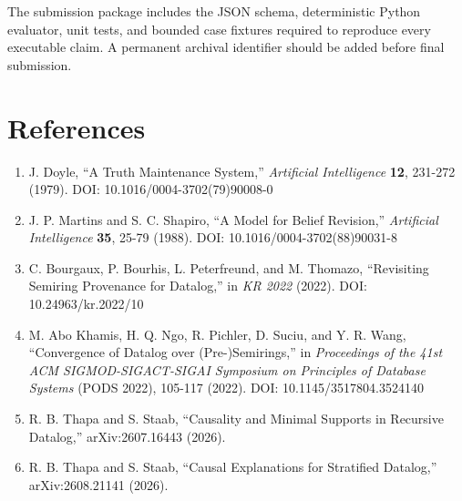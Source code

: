 \documentclass[
  11pt,
]{article}
\providecommand{\tightlist}{%
  \setlength{\itemsep}{0pt}\setlength{\parskip}{0pt}}
\begin{document}
The submission package includes the JSON schema, deterministic Python
evaluator, unit tests, and bounded case fixtures required to reproduce
every executable claim. A permanent archival identifier should be added
before final submission.

\hypertarget{references}{%
\section{References}\label{references}}

\begin{enumerate}
\def\labelenumi{\arabic{enumi}.}
\tightlist
\item
  J. Doyle, ``A Truth Maintenance System,'' \emph{Artificial
  Intelligence} \textbf{12}, 231-272 (1979). DOI:
  10.1016/0004-3702(79)90008-0
\item
  J. P. Martins and S. C. Shapiro, ``A Model for Belief Revision,''
  \emph{Artificial Intelligence} \textbf{35}, 25-79 (1988). DOI:
  10.1016/0004-3702(88)90031-8
\item
  C. Bourgaux, P. Bourhis, L. Peterfreund, and M. Thomazo, ``Revisiting
  Semiring Provenance for Datalog,'' in \emph{KR 2022} (2022). DOI:
  10.24963/kr.2022/10
\item
  M. Abo Khamis, H. Q. Ngo, R. Pichler, D. Suciu, and Y. R. Wang,
  ``Convergence of Datalog over (Pre-)Semirings,'' in \emph{Proceedings
  of the 41st ACM SIGMOD-SIGACT-SIGAI Symposium on Principles of
  Database Systems} (PODS 2022), 105-117 (2022). DOI:
  10.1145/3517804.3524140
\item
  R. B. Thapa and S. Staab, ``Causality and Minimal Supports in
  Recursive Datalog,'' arXiv:2607.16443 (2026).
\item
  R. B. Thapa and S. Staab, ``Causal Explanations for Stratified
  Datalog,'' arXiv:2608.21141 (2026).
\end{enumerate}
\end{document}
